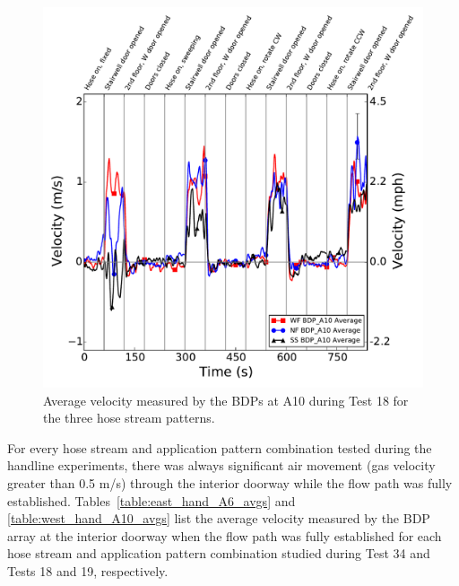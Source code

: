 \documentclass[12pt,oneside]{book}
\begin{document}
\begin{figure}[!ht]
	\includegraphics[width=6in]{../Figures/Plots/Test_18_West_063014_BDP_A10_stream_avgs}
	\caption{Average velocity measured by the BDPs at A10 during Test 18 for the three hose stream patterns.}
	\label{fig:Test_18_BDP_A10_Avg_All}
\end{figure}
\FloatBarrier

For every hose stream and application pattern combination tested during the handline experiments, there was always significant air movement (gas velocity greater than 0.5 m/s) through the interior doorway while the flow path was fully established. Tables~\ref{table:east_hand_A6_avgs} and \ref{table:west_hand_A10_avgs} list the average velocity measured by the BDP array at the interior doorway when the flow path was fully established for each hose stream and application pattern combination studied during Test 34 and Tests 18 and 19, respectively.

\end{document}
